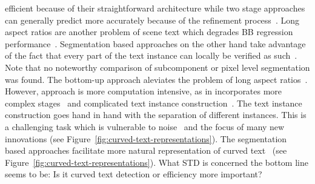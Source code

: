 efficient  because of their straightforward architecture while two stage approaches can generally
predict more accurately  because of the refinement process~\citep{lu_mimicdet_2020}.
Long aspect ratios are another problem of scene text which degrades \ac{BB} regression
performance~\citep{shi_detecting_2017,long_scene_2021}.
Segmentation based approaches on the other hand take advantage of the fact that every part of the
text instance can locally be verified as such~\citep{long_scene_2021}.
Note that no noteworthy comparison of subcomponent or pixel level segmentation was found.
The bottom-up approach aleviates the problem of long aspect ratios~\citep{shi_detecting_2017}.
However, approach is more computation intensive, as in incorporates more complex
stages~\citep{dai_fused_2018} and complicated text instance
construction~\citep{xie_aggregation_2019,liao_real-time_2019,dai_fused_2018}.
The text instance construction goes hand in hand with the separation of different instances.
This is a challenging task which is vulnerable to noise~\citep{long_scene_2021} and the focus of
many new innovations (see Figure~\ref{fig:curved-text-representations}).
The segmentation based approaches facilitate more natural representation of curved
text~\citep{dai_fused_2018,long_scene_2021} (see Figure~\ref{fig:curved-text-representations}).
What \ac{STD} is concerned the bottom line seems to be: Is it curved text detection or efficiency
more important?

